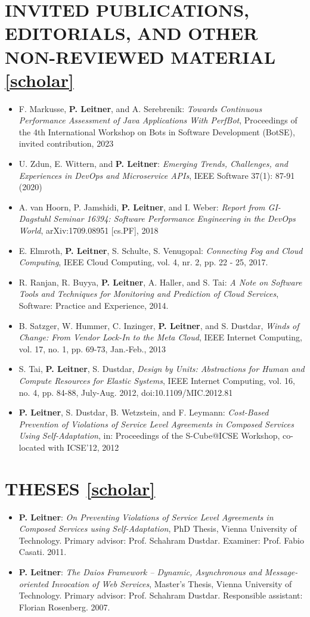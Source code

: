 \documentclass[paper=letter,fontsize=11pt]{scrartcl} %
\newcommand{\NewPart}[2]{\section*{\uppercase{#1} #2}}
\begin{document}
\NewPart{Invited Publications, Editorials, and Other Non-Reviewed Material}{\href{https://scholar.google.ch/citations?user=wZ9f8CAAAAAJ}{[scholar]}}

\begin{itemize}
  \item  F. Markusse, \textbf{P. Leitner}, and  A. Serebrenik: \emph{Towards Continuous Performance Assessment of Java Applications With PerfBot}, Proceedings of the 4th International Workshop on Bots in Software Development (BotSE), invited contribution, 2023
	\item  U. Zdun, E. Wittern, and \textbf{P. Leitner}: \emph{Emerging Trends, Challenges, and Experiences in DevOps and Microservice APIs}, IEEE Software 37(1): 87-91 (2020)
	\item A. van Hoorn, P. Jamshidi, \textbf{P. Leitner}, and I. Weber:
	\emph{Report from GI-Dagstuhl Seminar 16394: Software Performance Engineering in the DevOps World}, arXiv:1709.08951 [cs.PF], 2018
	\item E. Elmroth, \textbf{P. Leitner}, S. Schulte, S. Venugopal:
  \emph{Connecting Fog and Cloud Computing}, IEEE Cloud Computing, vol. 4, nr. 2, pp. 22 - 25, 2017.
  \item R. Ranjan, R. Buyya, \textbf{P. Leitner}, A. Haller, and S. Tai:
  \emph{A Note on Software Tools and Techniques for Monitoring and Prediction of Cloud Services}, Software: Practice and Experience, 2014.
  \item B. Satzger, W. Hummer, C. Inzinger, \textbf{P. Leitner}, and S. Dustdar, \emph{Winds of Change: From Vendor Lock-In to the Meta Cloud}, IEEE Internet Computing, vol. 17, no. 1, pp. 69-73, Jan.-Feb., 2013
  \item S. Tai, \textbf{P. Leitner}, S. Dustdar, \emph{Design by Units: Abstractions for Human and Compute Resources for Elastic Systems}, IEEE Internet Computing, vol. 16, no. 4, pp. 84-88, July-Aug. 2012, doi:10.1109/MIC.2012.81
  \item \textbf{P. Leitner}, S. Dustdar, B. Wetzstein, and F.
  Leymann: \emph{Cost-Based Prevention of Violations of Service Level Agreements
  in Composed Services Using Self-Adaptation}, in: Proceedings of the S-Cube@ICSE Workshop, co-located with ICSE'12, 2012
\end{itemize}

\NewPart{Theses}{\href{https://scholar.google.ch/citations?user=wZ9f8CAAAAAJ}{[scholar]}}

\begin{itemize}
  \item \textbf{P. Leitner}: \emph{On Preventing Violations of Service Level
  Agreements in Composed Services using Self-Adaptation},  PhD Thesis, Vienna
  University of Technology. Primary advisor: Prof. Schahram Dustdar. Examiner:
  Prof. Fabio Casati. 2011.
  \item \textbf{P. Leitner}: \emph{The Daios Framework -- Dynamic, Asynchronous
  and Message-oriented Invocation of Web Services},  Master's Thesis, Vienna
  University of Technology. Primary advisor: Prof. Schahram Dustdar. Responsible
  assistant: Florian Rosenberg. 2007.
\end{itemize}
\end{document}
